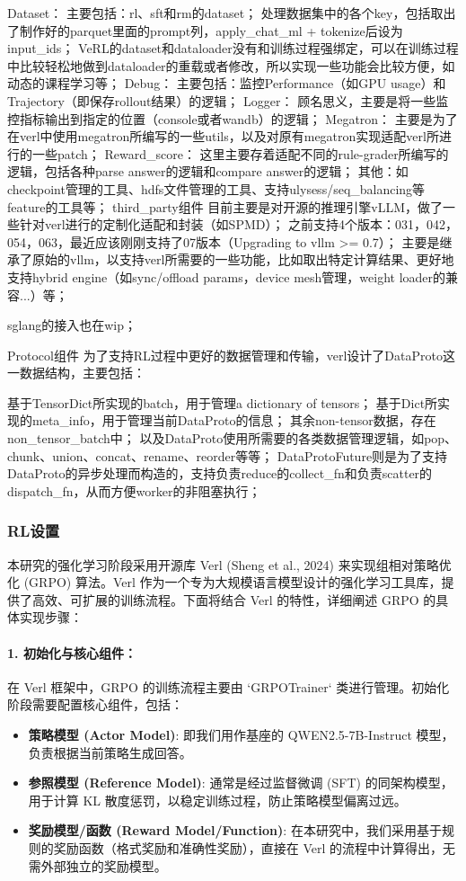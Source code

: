 \documentclass{pkuthesis}
\begin{document}
Dataset：
主要包括：rl、sft和rm的dataset；
处理数据集中的各个key，包括取出了制作好的parquet里面的prompt列，apply_chat_ml + tokenize后设为input_ids；
VeRL的dataset和dataloader没有和训练过程强绑定，可以在训练过程中比较轻松地做到dataloader的重载或者修改，所以实现一些功能会比较方便，如动态的课程学习等；
Debug：
主要包括：监控Performance（如GPU usage）和Trajectory（即保存rollout结果）的逻辑；
Logger：
顾名思义，主要是将一些监控指标输出到指定的位置（console或者wandb）的逻辑；
Megatron：
主要是为了在verl中使用megatron所编写的一些utils，以及对原有megatron实现适配verl所进行的一些patch；
Reward_score：
这里主要存着适配不同的rule-grader所编写的逻辑，包括各种parse answer的逻辑和compare answer的逻辑；
其他：如checkpoint管理的工具、hdfs文件管理的工具、支持ulysess/seq_balancing等feature的工具等；
third_party组件
目前主要是对开源的推理引擎vLLM，做了一些针对verl进行的定制化适配和封装（如SPMD）；
之前支持4个版本：031，042，054，063，最近应该刚刚支持了07版本（Upgrading to vllm >= 0.7）；
主要是继承了原始的vllm，以支持verl所需要的一些功能，比如取出特定计算结果、更好地支持hybrid engine（如sync/offload params，device mesh管理，weight loader的兼容...）等；

sglang的接入也在wip；

Protocol组件
为了支持RL过程中更好的数据管理和传输，verl设计了DataProto这一数据结构，主要包括：

基于TensorDict所实现的batch，用于管理a dictionary of tensors；
基于Dict所实现的meta_info，用于管理当前DataProto的信息；
其余non-tensor数据，存在non_tensor_batch中；
以及DataProto使用所需要的各类数据管理逻辑，如pop、chunk、union、concat、rename、reorder等等；
DataProtoFuture则是为了支持DataProto的异步处理而构造的，支持负责reduce的collect_fn和负责scatter的dispatch_fn，从而方便worker的非阻塞执行；

\subsubsection{RL设置}
本研究的强化学习阶段采用开源库 Verl (Sheng et al., 2024) 来实现组相对策略优化 (GRPO) 算法。Verl 作为一个专为大规模语言模型设计的强化学习工具库，提供了高效、可扩展的训练流程。下面将结合 Verl 的特性，详细阐述 GRPO 的具体实现步骤：

\paragraph{1. 初始化与核心组件：}
在 Verl 框架中，GRPO 的训练流程主要由 `GRPOTrainer` 类进行管理。初始化阶段需要配置核心组件，包括：
\begin{itemize}
    \item \textbf{策略模型 (Actor Model)}: 即我们用作基座的 QWEN2.5-7B-Instruct 模型，负责根据当前策略生成回答。
    \item \textbf{参照模型 (Reference Model)}: 通常是经过监督微调 (SFT) 的同架构模型，用于计算 KL 散度惩罚，以稳定训练过程，防止策略模型偏离过远。
    \item \textbf{奖励模型/函数 (Reward Model/Function)}: 在本研究中，我们采用基于规则的奖励函数（格式奖励和准确性奖励），直接在 Verl 的流程中计算得出，无需外部独立的奖励模型。
\end{itemize}
\end{document}
